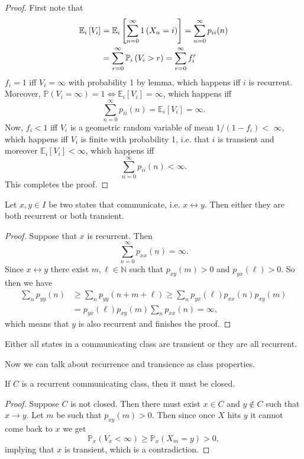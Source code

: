 \documentclass[a4paper]{article}
\begin{document}
\begin{proof}
    First note that
    \begin{align*}
        \mathbb{E}_i\left[V_i\right]&=\mathbb{E}_i\left[\sum_{n=0}^{\infty} 1\left(X_n=i\right)\right]=\sum_{n=0}^{\infty} p_{i i}(n)\\ 
        &=\sum_{r=0}^{\infty} {\mathbb{P}}_i\left(V_i>r\right)=\sum_{r=0}^{\infty} f_i^r
    \end{align*}
    $f_i=1$ iff $V_i=\infty$ with probability 1 by lemma, which happens iff $i$ is recurrent. Moreover, $\mathbb{P}(V_i=\infty)=1 \Leftrightarrow \mathbb{E}_i\left[V_i\right]=\infty$, which happens iff
    \[
    \sum_{n=0}^{\infty} p_{i i}(n)=\mathbb{E}_i\left[V_i\right]=\infty .
    \]
    Now, $f_i<1$ iff $V_i$ is a geometric random variable of mean $1 /\left(1-f_i\right)<$ $\infty$, which happens iff $V_i$ is finite with probability 1, i.e. that $i$ is transient and moreover $\mathbb{E}_i\left[V_i\right]<\infty$, which happens iff
    \[
    \sum_{n=0}^{\infty} p_{i i}(n)<\infty .
    \]
    This completes the proof.
\end{proof}

\begin{theorem}
    Let $x, y \in I$ be two states that communicate, i.e. $x \leftrightarrow y$. Then either they are both recurrent or both transient.
\end{theorem}
\begin{proof}
    Suppose that $x$ is recurrent. Then
    \[
    \sum_{n=0}^{\infty} p_{x x}(n)=\infty .
    \]
    Since $x \leftrightarrow y$ there exist $m, \ell \in \mathbb{N}$ such that $p_{x y}(m)>0$ and $p_{y x}(\ell)>0$. So then we have
    \begin{align*}
        \sum_n p_{y y}(n) &\geq \sum_n p_{y y}(n+m+\ell) \geq \sum_n p_{y x}(\ell) p_{x x}(n) p_{x y}(m)\\ 
        &=p_{y x}(\ell) p_{x y}(m) \sum_n p_{x x}(n)=\infty,
    \end{align*}
    which means that $y$ is also recurrent and finishes the proof.
\end{proof}

\begin{corollary}
    Either all states in a communicating class are transient or they are all recurrent. 
\end{corollary}

Now we can talk about recurrence and transience as class properties. 

\begin{theorem}
    If $C$ is a recurrent communicating class, then it must be closed.
\end{theorem}
\begin{proof}
    Suppose $C$ is not closed. Then there must exist $x \in C$ and $y \notin C$ such that $x \rightarrow y$. Let $m$ be such that $p_{x y}(m)>0$. Then since once $X$ hits $y$ it cannot come back to $x$ we get
    \[
    \mathbb{P}_x\left(V_x<\infty\right) \geq \mathbb{P}_x\left(X_m=y\right)>0,
    \]
    implying that $x$ is transient, which is a contradiction.
\end{proof}
\end{document}
